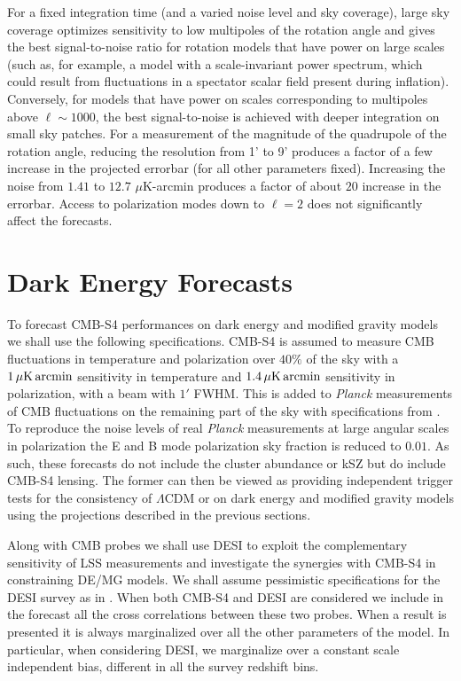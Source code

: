 For a fixed integration time (and a varied noise level and sky coverage), large sky coverage optimizes sensitivity to low multipoles of the rotation angle and gives the best signal-to-noise ratio for rotation models that have power on large scales (such as, for example, a model with a scale-invariant power spectrum, which could result from fluctuations in a spectator scalar field present during inflation). Conversely, for models that have power on scales corresponding to multipoles above $\ell\sim 1000$, the best signal-to-noise is achieved with deeper integration on small sky patches.  For a measurement of the magnitude of the quadrupole of the rotation angle, reducing the resolution from 1' to 9' produces a factor of a few increase in the projected errorbar (for all other parameters fixed). Increasing the noise from $1.41$ to $12.7$ $\mu$K-arcmin produces a factor of about $20$ increase in the errorbar. Access to polarization modes down to $\ell=2$ does not significantly affect the forecasts. 


%

%
\section{Dark Energy Forecasts}
%
\label{sec:deforecasts}

To forecast CMB-S4 performances on dark energy and modified gravity models we shall use the following specifications.
CMB-S4 is assumed to measure CMB fluctuations in temperature and polarization over $40 \%$ of the sky with a $1\,\mu {\rm K} \, {\rm arcmin}$ sensitivity in temperature and $1.4\,\mu {\rm K} \, {\rm arcmin}$ sensitivity in polarization, with a beam with $1'$ FWHM. This is added to {\it Planck} measurements of CMB fluctuations on the remaining part of the sky with specifications from \cite{Adam:2015rua}. To reproduce the noise levels of real {\it Planck} measurements at large angular scales in polarization the E and B mode polarization sky fraction is reduced to $0.01$.
 As such, 
these forecasts do not include the cluster abundance or kSZ but do include CMB-S4 lensing.  The former
can then be viewed as providing independent trigger tests for the consistency of $\Lambda$CDM or    on dark energy and modified gravity models 
using the projections described in the previous sections.


Along with CMB probes we shall use DESI to exploit the complementary sensitivity of LSS measurements and investigate the synergies with CMB-S4 in constraining DE/MG models.
We shall assume pessimistic specifications for the DESI survey as in \cite{Font-Ribera:2013rwa}.
When both CMB-S4 and DESI are considered we include in the forecast all the cross correlations between these two probes. 
When a result is presented it is always marginalized over all the other parameters of the model. 
In particular, when considering DESI, we marginalize over a constant scale independent bias, different in all the survey redshift bins.
%

